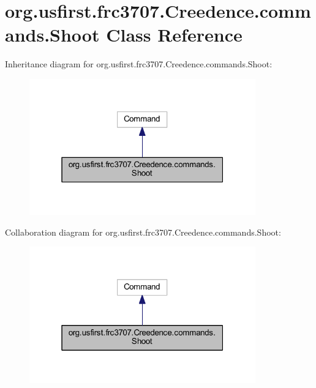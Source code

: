 \hypertarget{classorg_1_1usfirst_1_1frc3707_1_1_creedence_1_1commands_1_1_shoot}{}\section{org.\+usfirst.\+frc3707.\+Creedence.\+commands.\+Shoot Class Reference}
\label{classorg_1_1usfirst_1_1frc3707_1_1_creedence_1_1commands_1_1_shoot}


Inheritance diagram for org.\+usfirst.\+frc3707.\+Creedence.\+commands.\+Shoot\+:
\nopagebreak
\begin{figure}[H]
\begin{center}
\leavevmode
\includegraphics[width=277pt]{classorg_1_1usfirst_1_1frc3707_1_1_creedence_1_1commands_1_1_shoot__inherit__graph}
\end{center}
\end{figure}


Collaboration diagram for org.\+usfirst.\+frc3707.\+Creedence.\+commands.\+Shoot\+:
\nopagebreak
\begin{figure}[H]
\begin{center}
\leavevmode
\includegraphics[width=277pt]{classorg_1_1usfirst_1_1frc3707_1_1_creedence_1_1commands_1_1_shoot__coll__graph}
\end{center}
\end{figure}
